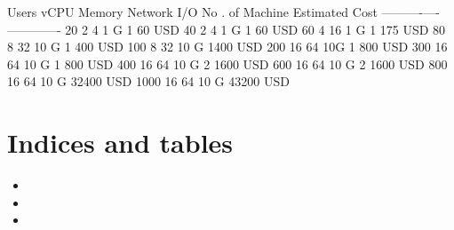 \documentclass[letterpaper,10pt,english]{sphinxmanual}
\begin{document}

\textbar{} Users \textbar{}  vCPU \textbar{} Memory \textbar{}  Network I/O \textbar{} No . of Machine \textbar{} Estimated Cost\textbar{}
\textbar{}——\textbar{}—-\textbar{}—-\textbar{}——\textbar{}—\textendash{}\textbar{}—-\textbar{}
\textbar{} 20 \textbar{}  2 \textbar{} 4\textbar{}  1 G \textbar{} 1\textbar{} 60 USD\textbar{}
\textbar{} 40 \textbar{}  2 \textbar{} 4\textbar{}  1 G \textbar{} 1\textbar{} 60 USD \textbar{}
\textbar{} 60 \textbar{}  4 \textbar{} 16 \textbar{}  1 G \textbar{} 1\textbar{} 175 USD\textbar{}
\textbar{} 80 \textbar{}  8 \textbar{} 32\textbar{}  10 G \textbar{} 1\textbar{} 400 USD\textbar{}
\textbar{} 100 \textbar{}  8 \textbar{} 32\textbar{}  10 G \textbar{} 1\textbar{}400 USD \textbar{}
\textbar{} 200 \textbar{}  16 \textbar{} 64\textbar{}  10G \textbar{} 1\textbar{} 800 USD\textbar{}
\textbar{} 300 \textbar{}  16 \textbar{} 64\textbar{}  10 G \textbar{} 1\textbar{} 800 USD\textbar{}
\textbar{} 400 \textbar{}  16 \textbar{} 64\textbar{}  10 G \textbar{} 2\textbar{} 1600 USD\textbar{}
\textbar{} 600 \textbar{}  16 \textbar{} 64\textbar{}  10 G \textbar{} 2\textbar{} 1600 USD\textbar{}
\textbar{} 800 \textbar{}  16 \textbar{} 64\textbar{}  10 G \textbar{} 3\textbar{}2400 USD \textbar{}
\textbar{} 1000 \textbar{}  16 \textbar{} 64\textbar{}  10 G \textbar{} 4\textbar{}3200 USD \textbar{}


\chapter{Indices and tables}
\label{\detokenize{index:indices-and-tables}}\begin{itemize}
\item {} 

\item {} 

\item {} 

\end{itemize}



\renewcommand{\indexname}{Index}
\printindex
\end{document}

